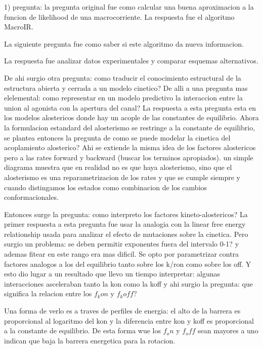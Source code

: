 \documentclass[a4paper,12pt]{article}
\begin{document}
		1) pregunta: 
		la pregunta original fue como calcular una buena aproximacion a la funcion de likelihood de una macrocorriente. 
		La respuesta fue el algoritmo MacroIR. 
		
		La siguiente pregunta fue como saber si este algoritmo da nueva informacion. 
		
		La respuesta fue analizar datos experimentales y comparar esquemas alternativos. 
		
		De ahi surgio otra pregunta: como traducir el conocimiento estructural de la estructura abierta y cerrada a un modelo cinetico?
		De alli a una pregunta mas elelemental: como representar en un modelo predictivo la interaccion entre la union al agonista con la apertura del canal? 
		La respuesta a esta pregunta esta en los modelos alostericos donde hay un acople de las constantes de equilibrio. 
		Ahora la formulacion estandard del alosterismo se restringe a la constante de equilibrio, se plantea entonces la pregunta de como se puede modelar la cinetica del acoplamiento alosterico?
		Ahi se extiende la misma idea de los factores alostericos pero a las rates forward y backward (buscar los terminos apropiados). un simple diagrama muestra que en realidad no es que haya alosterismo, sino que el alosterismo es una reparametrizacion de los rates y que se cumple siempre y cuando distingamos los estados como combinacion de los cambios conformacionales. 
		
		Entonces surge la pregunta: como interpreto los factores kineto-alostericos? La primer respuesta a esta pregunta fue usar la analogia con la linear free energy relationship usada para analizar el efecto de mutaciones sobre la cinetica. Pero surgio un problema: se deben permitir exponentes fuera del intervalo 0-1? y ademas fitear en este rango era mas dificil. Se opto por parametrizar contra factores analogos a los del equilibrio tanto sobre los k/ron como sobre los off. Y esto dio lugar a un resultado que llevo un tiempo interpretar: algunas interacciones asceleraban tanto la kon como la koff y ahi surgio la pregunta: 
		que significa la relacion entre los $f_kon$ y $f_koff$?
		
		Una forma de verlo es a traves de perfiles de energia: el alto de la barrera es proporcional al logaritmo del kon y la diferencia entre kon y koff es proporcional a la constante de equilibrio. 
		De esta forma wue  los $f_on$ y $f_off$ sean mayores a uno indican que baja la barrera energetica para la rotacion. 
		
\end{document}

